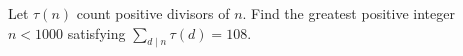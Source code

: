 Let $\tau(n)$ count positive divisors of $n$. Find the greatest positive integer $n<1000$ satisfying $\sum_{d\mid n}\tau(d)=108$.
